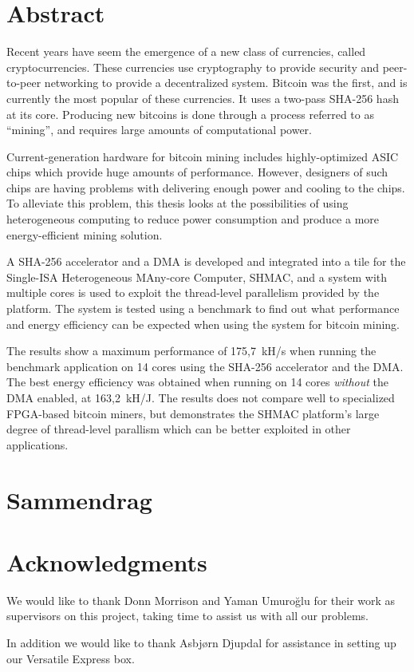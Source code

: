 \chapter*{Abstract}

Recent years have seem the emergence of a new class of currencies, called
cryptocurrencies. These currencies use cryptography to provide security
and peer-to-peer networking to provide a decentralized system. Bitcoin was the
first, and is currently the most popular of these currencies. It uses a two-pass
SHA-256 hash at its core. Producing new bitcoins is done through a process
referred to as ``mining'', and requires large amounts of computational
power.

Current-generation hardware for bitcoin mining includes highly-optimized
ASIC chips which provide huge amounts of performance. However, designers of
such chips are having problems with delivering enough power and cooling
to the chips. To alleviate this problem, this thesis looks at the possibilities
of using heterogeneous computing to reduce power consumption and produce a more
energy-efficient mining solution.

A SHA-256 accelerator and a DMA is developed and integrated into a tile for
the Single-ISA Heterogeneous MAny-core Computer, SHMAC, and a system with
multiple cores is used to exploit the thread-level parallelism provided by
the platform. The system is tested using a benchmark to find out what performance
and energy efficiency can be expected when using the system for bitcoin mining.

The results show a maximum performance of 175,7~kH/s when running the benchmark
application on 14 cores using the SHA-256 accelerator and the DMA. The best
energy efficiency was obtained when running on 14 cores \emph{without} the DMA enabled,
at 163,2~kH/J. The results does not compare well to specialized FPGA-based
bitcoin miners, but demonstrates the SHMAC platform's large degree of thread-level parallism
which can be better exploited in other applications.

\chapter*{Sammendrag}

\chapter*{Acknowledgments}


We would like to thank Donn Morrison and Yaman Umuroğlu for their work as
supervisors on this project, taking time to assist us with all our problems.

In addition we would like to thank Asbjørn Djupdal for assistance in setting
up our Versatile Express box.

